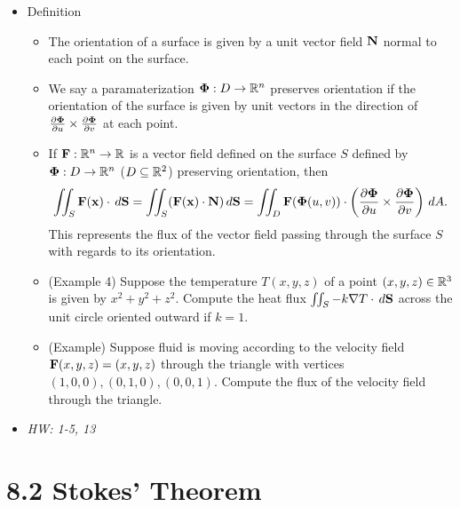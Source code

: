\documentclass[11pt]{article}
\begin{document}
\begin{itemize}
  \item Definition
    \begin{itemize}
      \item The orientation of a surface is given by a unit vector field
            \(\mathbf{N}\) normal to each point on the surface.
      \item We say a paramaterization \(\mathbf{\Phi}:D\to\mathbb R^n\)
            preserves orientation if the orientation of the surface
            is given by unit vectors in the direction of
            \(\frac{\partial\mathbf{\Phi}}{\partial u}\times \frac{\partial\mathbf{\Phi}}{\partial v}\)
            at each point.
      \item If \(\mathbf{F}:\mathbb R^n\to\mathbb R\) is a vector field defined
            on the surface \(S\) defined by
            \(\mathbf{\Phi}:D\to\mathbb R^n\)
            (\(D\subseteq\mathbb R^2\)) preserving orientation, then
            \[
              \iint_S \mathbf{F}(\mathbf{x})\cdot\,d\mathbf{S}
                =
              \iint_S (\mathbf{F}(\mathbf{x})\cdot\mathbf{N})\,d\mathbf{S}
                =
              \iint_D
                \mathbf{F}(\mathbf{\Phi}(u,v))
                \cdot
                \left(\frac{\partial\mathbf{\Phi}}{\partial u}\times\frac{\partial\mathbf{\Phi}}{\partial v}\right)
              \,d A
            .\]
            This represents the flux of the vector field passing through
            the surface \(S\) with regards to its orientation.
      \item (Example 4) Suppose the temperature \(T(x,y,z)\) of a point
            \((x,y,z)\in\mathbb R^3\) is given by \(x^2+y^2+z^2\). Compute
            the heat flux \(\iint_S-k\nabla T\cdot\,d\mathbf{S}\) across
            the unit circle oriented outward if \(k=1\).
      \item (Example) Suppose fluid is moving according to the velocity field
            \(\mathbf{F}(x,y,z)=(x,y,z)\) through the triangle with vertices
            \((1,0,0),(0,1,0),(0,0,1)\). Compute the flux of the velocity field
            through the triangle.
    \end{itemize}
  \item\textit{
    HW: 1-5, 13
  }
\end{itemize}

\section*{8.2 Stokes' Theorem}
\end{document}
